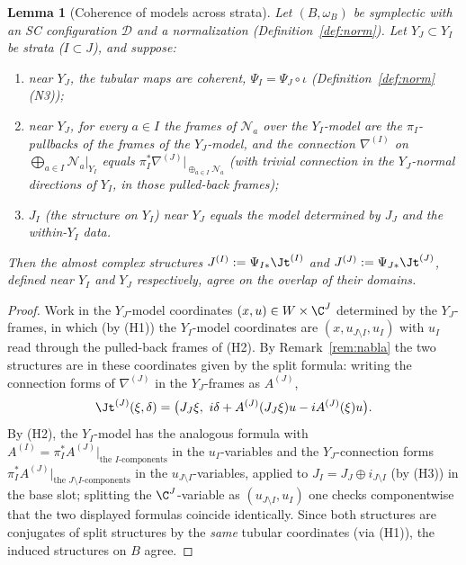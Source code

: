 \documentclass[11pt]{amsart}
\theoremstyle{plain}
\newtheorem{lemma}[theorem]{Lemma}
\theoremstyle{definition}
\newcommand{\NN}{\mathcal{N}}
\newcommand{\DD}{\mathcal{D}}
\begin{document}
\begin{lemma}[Coherence of models across strata]\label{lem:coherence}
Let $(B,\omega_B)$ be symplectic with an SC configuration $\DD$ and a
normalization (Definition~\ref{def:norm}). Let $Y_J\subset Y_I$ be strata
($I\subset J$), and suppose:
\begin{enumerate}
\item[(H1)] near $Y_J$, the tubular maps are coherent,
$\Psi_I=\Psi_J\circ\iota$ (Definition~\ref{def:norm}(N3));
\item[(H2)] near $Y_J$, for every $a\in I$ the frames of $\NN_a$ over the
$Y_I$-model are the $\pi_I$-pullbacks of the frames of the $Y_J$-model, and
the connection $\nabla^{(I)}$ on $\bigoplus_{a\in I}\NN_a|_{Y_I}$ equals
$\pi_I^*\nabla^{(J)}{}|_{\oplus_{a\in I}\NN_a}$ (with trivial connection in
the $Y_J$-normal directions of $Y_I$, in those pulled-back frames);
\item[(H3)] $J_I$ (the structure on $Y_I$) near $Y_J$ equals the model
determined by $J_J$ and the within-$Y_I$ data.
\end{enumerate}
Then the almost complex structures $J^{(I)}:=\Psi_{I*}\Jt^{(I)}$ and
$J^{(J)}:=\Psi_{J*}\Jt^{(J)}$, defined near $Y_I$ and $Y_J$ respectively,
agree on the overlap of their domains.
\end{lemma}

\begin{proof}
Work in the $Y_J$-model coordinates $(x,u)\in W\times\C^{J}$ determined by
the $Y_J$-frames, in which (by (H1)) the $Y_I$-model coordinates are
$(x,u_{J\setminus I},u_I)$ with $u_I$ read through the pulled-back frames of
(H2). By Remark~\ref{rem:nabla} the two structures are in these coordinates
given by the split formula: writing the connection forms of
$\nabla^{(J)}$ in the $Y_J$-frames as $A^{(J)}$,
\[
\Jt^{(J)}(\xi,\delta)=\bigl(J_J\xi,\ i\delta+A^{(J)}(J_J\xi)u
-iA^{(J)}(\xi)u\bigr).
\]
By (H2), the $Y_I$-model has the analogous formula with $A^{(I)}=\pi_I^*
A^{(J)}|_{\text{the }I\text{-components}}$ in the $u_I$-variables and the
$Y_J$-connection forms $\pi_I^*A^{(J)}|_{\text{the }J\setminus I
\text{-components}}$ in the $u_{J\setminus I}$-variables, applied to
$J_I=J_J\oplus i_{J\setminus I}$ (by (H3)) in the base slot; splitting the
$\C^J$-variable as $(u_{J\setminus I},u_I)$ one checks componentwise that the
two displayed formulas coincide identically. Since both structures are
conjugates of split structures by the \emph{same} tubular coordinates
(via (H1)), the induced structures on $B$ agree.
\end{proof}
\end{document}
